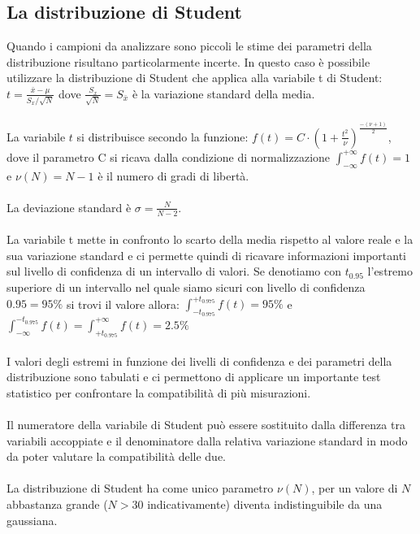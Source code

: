 \documentclass{article}
\begin{document}
\subsection{La distribuzione di Student}
Quando i campioni da analizzare sono piccoli le stime dei parametri della distribuzione risultano particolarmente incerte. In questo caso è possibile utilizzare la distribuzione di Student che applica alla variabile t di Student: $t=\frac{\bar{x}-\mu}{S_x/\sqrt{N}}$ dove $\frac{S_x}{\sqrt{N}} = S_{\bar{x}}$ è la variazione standard della media.\\\\
La variabile $t$ si distribuisce secondo la funzione: $f(t)=C\cdot \left(1+\frac{t^2}{\nu}\right)^{\frac{-(\nu+1)}{2}}$, dove il parametro C si ricava dalla condizione di normalizzazione $\int_{-\infty}^{+\infty}f(t) = 1$ e $\nu(N)=N-1$ è il numero di gradi di libertà.\\\\
La deviazione standard è $\sigma = \frac{N}{N-2}$.\\\\
La variabile t mette in confronto lo scarto della media rispetto al valore reale e la sua variazione standard e ci permette quindi di ricavare informazioni importanti sul livello di confidenza di un intervallo di valori. Se denotiamo con $t_{0.95}$ l'estremo superiore di un intervallo nel quale siamo sicuri con livello di confidenza $0.95=95\%$ si trovi il valore allora: $\int_{-t_{0.975}}^{+t_{0.975}}f(t)=95\%$ \quad e $\int_{-\infty}^{-t_{0.975}}f(t)=\int_{+t_{0.975}}^{+\infty}f(t)=2.5\%$\\\\
I valori degli estremi in funzione dei livelli di confidenza e dei parametri della distribuzione sono tabulati e ci permettono di applicare un importante test statistico per confrontare la compatibilità di più misurazioni.\\\\
Il numeratore della variabile di Student può essere sostituito dalla differenza tra variabili accoppiate e il denominatore dalla relativa variazione standard in modo da poter valutare la compatibilità delle due.\\\\
La distribuzione di Student ha come unico parametro $\nu(N)$, per un valore di $N$ abbastanza grande ($N>30$ indicativamente) diventa indistinguibile da una gaussiana.
\end{document}

